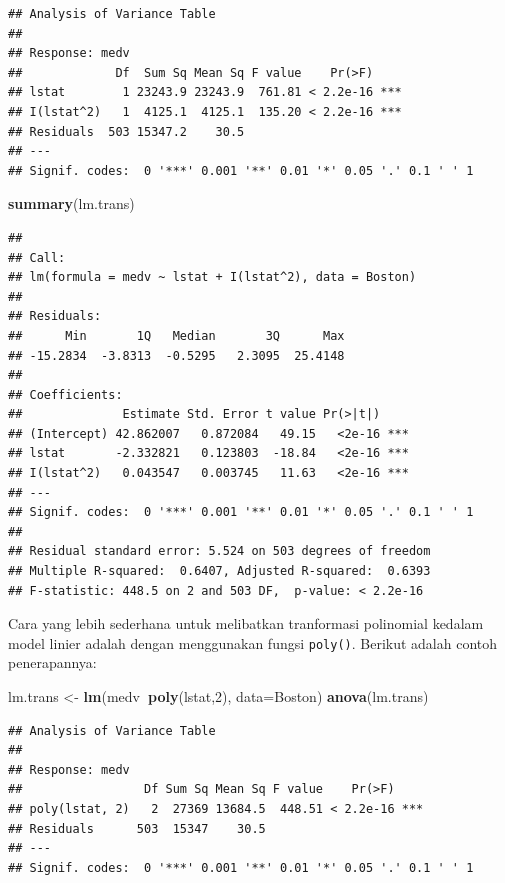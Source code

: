 \documentclass[]{book}
\newenvironment{Shaded}{\begin{snugshade}}{\end{snugshade}}
\newcommand{\DataTypeTok}[1]{\textcolor[rgb]{0.13,0.29,0.53}{#1}}
\newcommand{\DecValTok}[1]{\textcolor[rgb]{0.00,0.00,0.81}{#1}}
\newcommand{\KeywordTok}[1]{\textcolor[rgb]{0.13,0.29,0.53}{\textbf{#1}}}
\newcommand{\NormalTok}[1]{#1}
\newcommand{\OperatorTok}[1]{\textcolor[rgb]{0.81,0.36,0.00}{\textbf{#1}}}
\newcommand{\StringTok}[1]{\textcolor[rgb]{0.31,0.60,0.02}{#1}}
\theoremstyle{definition}
\theoremstyle{definition}
\theoremstyle{definition}
\theoremstyle{remark}
\begin{document}
\begin{verbatim}
## Analysis of Variance Table
## 
## Response: medv
##             Df  Sum Sq Mean Sq F value    Pr(>F)    
## lstat        1 23243.9 23243.9  761.81 < 2.2e-16 ***
## I(lstat^2)   1  4125.1  4125.1  135.20 < 2.2e-16 ***
## Residuals  503 15347.2    30.5                      
## ---
## Signif. codes:  0 '***' 0.001 '**' 0.01 '*' 0.05 '.' 0.1 ' ' 1
\end{verbatim}

\begin{Shaded}
\begin{Highlighting}[]
\KeywordTok{summary}\NormalTok{(lm.trans)}
\end{Highlighting}
\end{Shaded}

\begin{verbatim}
## 
## Call:
## lm(formula = medv ~ lstat + I(lstat^2), data = Boston)
## 
## Residuals:
##      Min       1Q   Median       3Q      Max 
## -15.2834  -3.8313  -0.5295   2.3095  25.4148 
## 
## Coefficients:
##              Estimate Std. Error t value Pr(>|t|)    
## (Intercept) 42.862007   0.872084   49.15   <2e-16 ***
## lstat       -2.332821   0.123803  -18.84   <2e-16 ***
## I(lstat^2)   0.043547   0.003745   11.63   <2e-16 ***
## ---
## Signif. codes:  0 '***' 0.001 '**' 0.01 '*' 0.05 '.' 0.1 ' ' 1
## 
## Residual standard error: 5.524 on 503 degrees of freedom
## Multiple R-squared:  0.6407, Adjusted R-squared:  0.6393 
## F-statistic: 448.5 on 2 and 503 DF,  p-value: < 2.2e-16
\end{verbatim}

Cara yang lebih sederhana untuk melibatkan tranformasi polinomial kedalam model linier adalah dengan menggunakan fungsi \texttt{poly()}. Berikut adalah contoh penerapannya:

\begin{Shaded}
\begin{Highlighting}[]
\NormalTok{lm.trans <-}\StringTok{ }\KeywordTok{lm}\NormalTok{(medv}\OperatorTok{~}\KeywordTok{poly}\NormalTok{(lstat,}\DecValTok{2}\NormalTok{), }\DataTypeTok{data=}\NormalTok{Boston)}
\KeywordTok{anova}\NormalTok{(lm.trans)}
\end{Highlighting}
\end{Shaded}

\begin{verbatim}
## Analysis of Variance Table
## 
## Response: medv
##                 Df Sum Sq Mean Sq F value    Pr(>F)    
## poly(lstat, 2)   2  27369 13684.5  448.51 < 2.2e-16 ***
## Residuals      503  15347    30.5                      
## ---
## Signif. codes:  0 '***' 0.001 '**' 0.01 '*' 0.05 '.' 0.1 ' ' 1
\end{verbatim}
\end{document}
